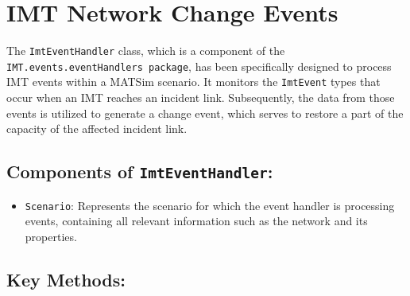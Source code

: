 \documentclass[fancy, oneside, mastersfancy, ms]{byuthesis}
\providecommand{\tightlist}{%
  \setlength{\itemsep}{0pt}\setlength{\parskip}{0pt}}\usepackage{longtable,booktabs,array}
\begin{document}
\hypertarget{sec-apend_nce}{%
\chapter{IMT Network Change Events}\label{sec-apend_nce}}

The \texttt{ImtEventHandler} class, which is a component of the
\texttt{IMT.events.eventHandlers\ package}, has been specifically
designed to process IMT events within a MATSim scenario. It monitors the
\texttt{ImtEvent} types that occur when an IMT reaches an incident link.
Subsequently, the data from those events is utilized to generate a
change event, which serves to restore a part of the capacity of the
affected incident link.

\hypertarget{components-of-imteventhandler}{%
\section{\texorpdfstring{Components of
\texttt{ImtEventHandler}:}{Components of ImtEventHandler:}}\label{components-of-imteventhandler}}

\begin{itemize}
\tightlist
\item
  \texttt{Scenario}: Represents the scenario for which the event handler
  is processing events, containing all relevant information such as the
  network and its properties.
\end{itemize}

\hypertarget{key-methods-1}{%
\section{Key Methods:}\label{key-methods-1}}
\end{document}
